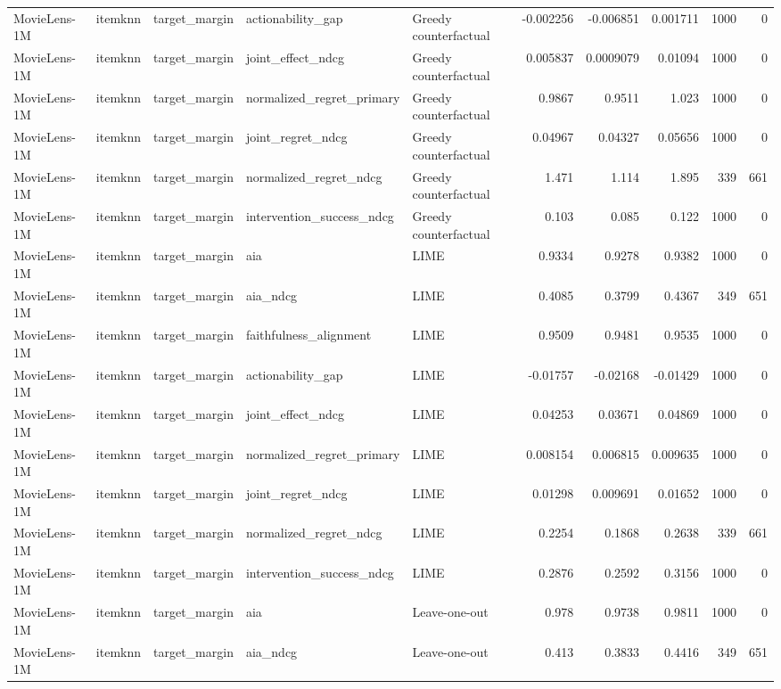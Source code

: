 \begin{table}[t]
\begin{tabular}{lllllrrrrr}
MovieLens-1M & itemknn & target\_margin & actionability\_gap & Greedy counterfactual & -0.002256 & -0.006851 & 0.001711 & 1000 & 0 \\
MovieLens-1M & itemknn & target\_margin & joint\_effect\_ndcg & Greedy counterfactual & 0.005837 & 0.0009079 & 0.01094 & 1000 & 0 \\
MovieLens-1M & itemknn & target\_margin & normalized\_regret\_primary & Greedy counterfactual & 0.9867 & 0.9511 & 1.023 & 1000 & 0 \\
MovieLens-1M & itemknn & target\_margin & joint\_regret\_ndcg & Greedy counterfactual & 0.04967 & 0.04327 & 0.05656 & 1000 & 0 \\
MovieLens-1M & itemknn & target\_margin & normalized\_regret\_ndcg & Greedy counterfactual & 1.471 & 1.114 & 1.895 & 339 & 661 \\
MovieLens-1M & itemknn & target\_margin & intervention\_success\_ndcg & Greedy counterfactual & 0.103 & 0.085 & 0.122 & 1000 & 0 \\
MovieLens-1M & itemknn & target\_margin & aia & LIME & 0.9334 & 0.9278 & 0.9382 & 1000 & 0 \\
MovieLens-1M & itemknn & target\_margin & aia\_ndcg & LIME & 0.4085 & 0.3799 & 0.4367 & 349 & 651 \\
MovieLens-1M & itemknn & target\_margin & faithfulness\_alignment & LIME & 0.9509 & 0.9481 & 0.9535 & 1000 & 0 \\
MovieLens-1M & itemknn & target\_margin & actionability\_gap & LIME & -0.01757 & -0.02168 & -0.01429 & 1000 & 0 \\
MovieLens-1M & itemknn & target\_margin & joint\_effect\_ndcg & LIME & 0.04253 & 0.03671 & 0.04869 & 1000 & 0 \\
MovieLens-1M & itemknn & target\_margin & normalized\_regret\_primary & LIME & 0.008154 & 0.006815 & 0.009635 & 1000 & 0 \\
MovieLens-1M & itemknn & target\_margin & joint\_regret\_ndcg & LIME & 0.01298 & 0.009691 & 0.01652 & 1000 & 0 \\
MovieLens-1M & itemknn & target\_margin & normalized\_regret\_ndcg & LIME & 0.2254 & 0.1868 & 0.2638 & 339 & 661 \\
MovieLens-1M & itemknn & target\_margin & intervention\_success\_ndcg & LIME & 0.2876 & 0.2592 & 0.3156 & 1000 & 0 \\
MovieLens-1M & itemknn & target\_margin & aia & Leave-one-out & 0.978 & 0.9738 & 0.9811 & 1000 & 0 \\
MovieLens-1M & itemknn & target\_margin & aia\_ndcg & Leave-one-out & 0.413 & 0.3833 & 0.4416 & 349 & 651 \\

\end{tabular}
\end{table}
